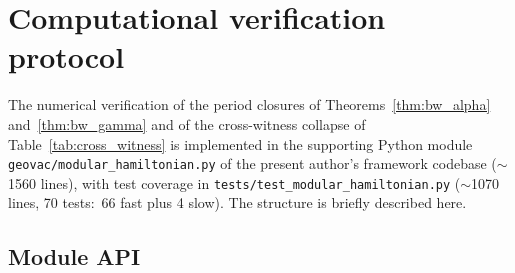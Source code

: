 \documentclass[11pt,a4paper]{article}
\theoremstyle{plain}
\theoremstyle{definition}
\begin{document}
\appendix
\section{Computational verification protocol}
\label{app:computational_verification}

The numerical verification of the period closures of
Theorems~\ref{thm:bw_alpha} and~\ref{thm:bw_gamma} and of the
cross-witness collapse of Table~\ref{tab:cross_witness} is
implemented in the supporting Python module
\verb|geovac/modular_hamiltonian.py| of the present author's framework
codebase ($\sim$1560 lines), with test coverage in
\verb|tests/test_modular_hamiltonian.py| ($\sim$1070 lines, 70 tests:\
66 fast plus 4 slow). The structure is briefly described here.

\subsection{Module API}\label{sec:module_api}
\end{document}
